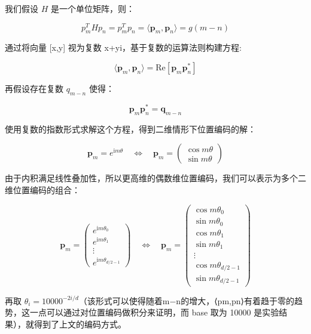 \documentclass[
]{article}
\begin{document}
我们假设 \(H\) 是一个单位矩阵，则：

\[
p_m^THp_n = p_m^Tp_n = \langle\boldsymbol{p}_m, \boldsymbol{p}_n\rangle = g(m-n)
\]

通过将向量 {[}x,y{]} 视为复数 x+yi，基于复数的运算法则构建方程:

\[
\begin{equation}\langle\boldsymbol{p}_m, \boldsymbol{p}_n\rangle = \text{Re}[\boldsymbol{p}_m \boldsymbol{p}_n^*]\end{equation}
\]

再假设存在复数 \(q_{m-n}\) 使得：

\[
\begin{equation}\boldsymbol{p}_m \boldsymbol{p}_n^* = \boldsymbol{q}_{m-n}\end{equation}
\]

使用复数的指数形式求解这个方程，得到二维情形下位置编码的解：

\[
\begin{equation}\boldsymbol{p}_m = e^{\text{i}m\theta}\quad\Leftrightarrow\quad \boldsymbol{p}_m=\begin{pmatrix}\cos m\theta \\ \sin m\theta\end{pmatrix}\end{equation}
\]

由于内积满足线性叠加性，所以更高维的偶数维位置编码，我们可以表示为多个二维位置编码的组合：

\[
\begin{equation}\boldsymbol{p}_m = \begin{pmatrix}e^{\text{i}m\theta_0} \\ e^{\text{i}m\theta_1} \\ \vdots \\ e^{\text{i}m\theta_{d/2-1}}\end{pmatrix}\quad\Leftrightarrow\quad \boldsymbol{p}_m=\begin{pmatrix}\cos m\theta_0 \\ \sin m\theta_0 \\ \cos m\theta_1 \\ \sin m\theta_1 \\ \vdots \\ \cos m\theta_{d/2-1} \\ \sin m\theta_{d/2-1}  \end{pmatrix}\end{equation}
\]

再取
\(\theta_i = 10000^{-2i/d}\)（该形式可以使得随着\textbar m−n\textbar 的增大，⟨pm,pn⟩有着趋于零的趋势，这一点可以通过对位置编码做积分来证明，而
base 取为 10000 是实验结果），就得到了上文的编码方式。
\end{document}
